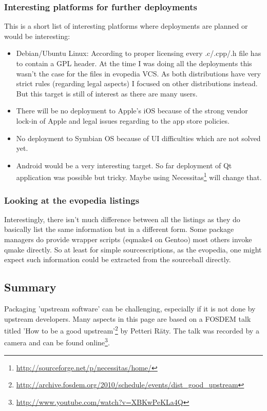 \documentclass[a4paper,10pt]{article}
\begin{document}
\subsubsection*{Interesting platforms for further deployments}
This is a short list of interesting platforms where deployments are planned or would be interesting:

\begin{itemize}
\item Debian/Ubuntu Linux: According to proper licensing every .c/.cpp/.h file has to contain a GPL header. At the time I was doing all the deployments this wasn't the case for the files in evopedia VCS. As both distributions have very strict rules (regarding legal aspects) I focused on other distributions instead. But this target is still of interest as there are many users.
\item There will be no deployment to Apple's iOS because of the strong vendor lock-in of Apple and legal issues regarding to the app store policies.
\item No deployment to Symbian OS because of UI difficulties which are not solved yet.
\item Android would be a very interesting target. So far deployment of Qt application was possible but tricky. Maybe using Necessitas\footnote{\url{http://sourceforge.net/p/necessitas/home/}} will change that.
\end{itemize}

\subsubsection*{Looking at the evopedia listings}
Interestingly, there isn't much difference between all the listings as they do basically list the same information but in a different form. Some package managers do provide wrapper scripts (eqmake4  on Gentoo) most others invoke qmake directly. So at least for simple sourcescriptions, as the evopedia, one might expect such information could be extracted from the sourceball directly.















\newpage
\subsection{Summary}
Packaging 'upstream software' can be challenging, especially if it is not done by upstream developers. Many aspects in this page are based on a FOSDEM talk titled 'How to be a good upstream'\footnote{\url{http://archive.fosdem.org/2010/schedule/events/dist\_good\_upstream}} by Petteri R\"aty. The talk was recorded by a camera and can be found online\footnote{\url{http://www.youtube.com/watch?v=XBKwPeKLa4Q}}.
\end{document}
